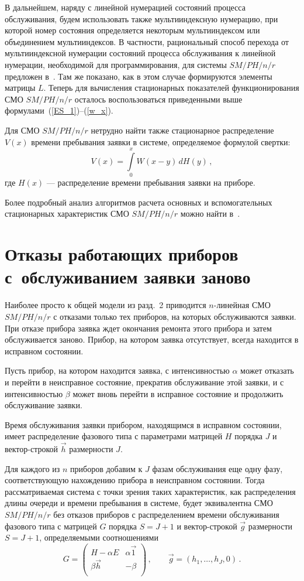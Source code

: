 \begin{multicols}{2}
В дальнейшем, наряду с линейной нумерацией состояний процесса
обслуживания, будем использовать также мультииндексную
нумерацию, при которой номер состояния определяется некоторым
мультииндексом или объединением мультииндексов.
В частности, рациональный способ перехода от мультииндексной нумерации
со\-сто\-яний процесса обслуживания
к линейной нумерации, необходимой для программирования, для сис\-те\-мы
$SM/PH/n/r$
предложен в~\cite{PCh03}.
Там же показано, как в этом случае формируются элементы матрицы $L$.
Теперь для вычисления стационарных показателей функционирования
СМО $SM/PH/n/r$ осталось воспользоваться приведенными выше
формулами~(\ref{ES_1})--(\ref{w_x}).

Для СМО $SM/PH/n/r$ нетрудно найти также стационарное
распределение $V(x)$ времени пребывания заявки в системе,
определяемое формулой свертки:
\begin{equation}
\label{v_x}
V(x) =
\int\limits_0^x
W(x-y)\, dH(y)\,,
\end{equation}
где $H(x)$ --- распределение времени пребывания заявки на приборе.

Более подробный анализ алгоритмов расчета
основных и вспомогательных стационарных характеристик СМО $SM/PH/n/r$
можно найти в~\cite{PCh03}.

\section{Отказы работающих приборов с~обслуживанием заявки заново}

Наиболее просто к общей модели из разд.~2
приводится $n$-линейная СМО $SM/PH/n/r$ с отказами
только тех приборов, на которых обслуживаются заявки.
При отказе прибора заявка ждет окончания ремонта этого прибора и затем
обслуживается заново.
Прибор, на котором заявка отсутствует, всегда находится в исправном
состоянии.

Пусть прибор, на котором находится заявка, с интенсивностью $\alpha$
может отказать и перейти в неисправное состояние, прекратив обслуживание
этой заявки, и с интенсивностью $\beta$ может вновь перейти в исправное
состояние и продолжить обслуживание заявки.

Время обслуживания заявки прибором, находящимся в исправном состоянии,
имеет распределение фазового типа с параметрами матрицей $H$ порядка $J$
и вектор-строкой $\vec h$ размерности $J$.

Для каждого из $n$ приборов добавим к $J$ фазам обслуживания еще
одну фазу, со\-от\-вет\-ст\-ву\-ющую нахождению прибора в неисправном состоянии.
Тогда рассматриваемая система с точки зрения таких характеристик, как
распределения длины очереди и времени пребывания в системе, будет
эквивалентна СМО $SM/PH/n/r$ без отказов приборов с
распределением времени обслуживания фазового типа с матрицей $G$ порядка
$S=J+1$ и вектор-строкой $\vec g$ размерности $S=J+1$, определяемыми
соотношениями
$$
G=
\begin{pmatrix}
H-\alpha E       &  \alpha \vec1  \\
\beta \vec h     &  - \beta        \\
\end{pmatrix}\,,
\qquad
\vec g =
(h_1,\ldots, h_J,0)\,.
$$


\end{multicols}
